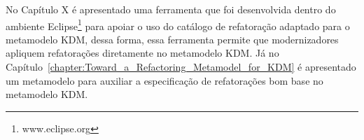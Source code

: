 No Capítulo  X é apresentado uma ferramenta que foi desenvolvida dentro do ambiente Eclipse\footnote{www.eclipse.org} para apoiar o uso do catálogo de refatoração adaptado para o metamodelo KDM, dessa forma, essa ferramenta permite que modernizadores apliquem refatorações diretamente no metamodelo KDM. Já no Capítulo~\ref{chapter:Toward_a_Refactoring_Metamodel_for_KDM} é apresentado um metamodelo para auxiliar a especificação de refatorações bom base no metamodelo KDM.  
